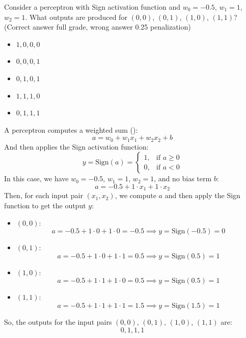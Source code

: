 \noindent
\exercise[1] Consider a perceptron with Sign activation function and $w_0 = -0.5$, $w_1= 1$, $w_2=1$. What outputs are produced for $(0,0)$, $(0,1)$, $(1,0)$, $(1,1)$? (Correct answer full grade, wrong answer 0.25 penalization)
\begin{itemize}
    \item $1, 0, 0, 0$
    \item $0, 0, 0, 1$
    \item $0, 1, 0, 1$
    \item $1, 1, 1, 0$
    \item $0, 1, 1, 1$
\end{itemize}
\solution A perceptron computes a weighted sum ():
\begin{equation*}
    a = w_0 + w_1 x_1 + w_2 x_2 + b
\end{equation*}
And then applies the Sign activation function:
\begin{equation*}
    y = \text{Sign}(a) =
    \begin{cases}
        1, & \text{if } a \geq 0 \\
        0, & \text{if } a < 0
    \end{cases}
\end{equation*}
In this case, we have $w_0 = -0.5$, $w_1 = 1$, $w_2 = 1$, and no bias term $b$:
\begin{equation*}
    a = -0.5 + 1 \cdot x_1 + 1 \cdot x_2
\end{equation*}
Then, for each input pair $(x_1, x_2)$, we compute $a$ and then apply the Sign function to get the output $y$:
\begin{itemize}
    \item $(0,0)$:
        \begin{equation*}
            a = -0.5 + 1 \cdot 0 + 1 \cdot 0 = -0.5 \implies y = \text{Sign}(-0.5) = 0
        \end{equation*}
    \item $(0,1)$:
        \begin{equation*}
            a = -0.5 + 1 \cdot 0 + 1 \cdot 1 = 0.5 \implies y = \text{Sign}(0.5) = 1
        \end{equation*}
    \item $(1,0)$:
        \begin{equation*}
            a = -0.5 + 1 \cdot 1 + 1 \cdot 0 = 0.5 \implies y = \text{Sign}(0.5) = 1
        \end{equation*}
    \item $(1,1)$:
        \begin{equation*}
            a = -0.5 + 1 \cdot 1 + 1 \cdot 1 = 1.5 \implies y = \text{Sign}(1.5) = 1
        \end{equation*}
\end{itemize}
So, the outputs for the input pairs $(0,0)$, $(0,1)$, $(1,0)$, $(1,1)$ are:
\begin{equation*}
    0, 1, 1, 1
\end{equation*}

